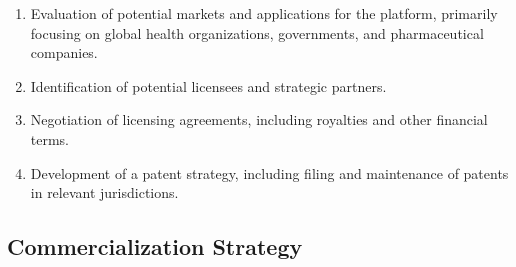 \documentclass[onecolumn, compsoc,12pt]{IEEEtran}
\begin{document}
\begin{enumerate}
    \item Evaluation of potential markets and applications for the platform, primarily focusing on global health organizations, governments, and pharmaceutical companies.
    \item Identification of potential licensees and strategic partners.
    \item Negotiation of licensing agreements, including royalties and other financial terms.
    \item Development of a patent strategy, including filing and maintenance of patents in relevant jurisdictions.
\end{enumerate}

\subsection{Commercialization Strategy}
\end{document}
